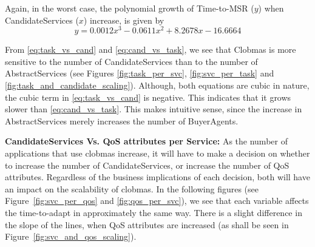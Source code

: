\documentclass[10pt,journal,compsoc]{IEEEtran}
\begin{document}
Again, in the worst case, the polynomial growth of Time-to-MSR ($y$) when CandidateServices ($x$) increase, is given by
\begin{equation}
    y =  0.0012x^{3} - 0.0611x^{2} +  8.2678x - 16.6664 \label{eq:cand_vs_task}
\end{equation}

From \autoref{eq:task_vs_cand} and \autoref{eq:cand_vs_task}, we see that Clobmas is more sensitive to the number of CandidateServices than to the number of AbstractServices (see Figures \ref{fig:task_per_svc}, \ref{fig:svc_per_task} and \ref{fig:task_and_candidate_scaling}). Although, both equations are cubic in nature, the cubic term in \autoref{eq:task_vs_cand} is negative. This indicates that it grows slower than \autoref{eq:cand_vs_task}. This makes intuitive sense, since the increase in AbstractServices merely increases the number of BuyerAgents. 

\textbf{CandidateServices Vs. QoS attributes per Service:}
As the number of applications that use clobmas increase, it will have to make a decision on whether to increase the number of CandidateServices, or increase the number of QoS attributes. Regardless of the business implications of each decision, both will have an impact on the scalability of clobmas. In the following figures (see Figure~\ref{fig:svc_per_qos} and \ref{fig:qos_per_svc}), we see that each variable affects the time-to-adapt in approximately the same way. There is a slight difference in the slope of the lines, when QoS attributes are increased (as shall be seen in Figure~\ref{fig:svc_and_qos_scaling}).
\end{document}
